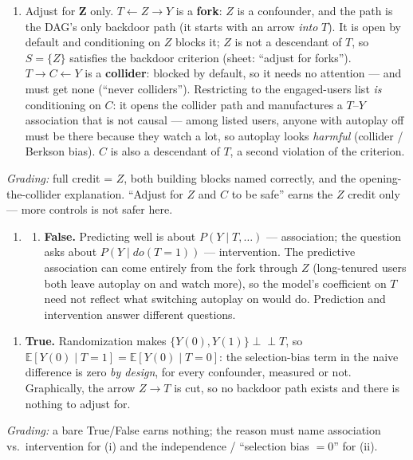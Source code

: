 \documentclass[
  11pt,
]{article}
\newcounter{none} %
\providecommand{\tightlist}{%
  \setlength{\itemsep}{0pt}\setlength{\parskip}{0pt}}
\begin{document}
\begin{solutionbox}

\begin{enumerate}
\def\labelenumi{(\alph{enumi})}
\tightlist
\item
  Adjust for \(\mathbf{Z}\) only. \(T\leftarrow Z\to Y\) is a
  \textbf{fork}: \(Z\) is a confounder, and the path is the DAG's only
  backdoor path (it starts with an arrow \emph{into} \(T\)). It is open
  by default and conditioning on \(Z\) blocks it; \(Z\) is not a
  descendant of \(T\), so \(S=\{Z\}\) satisfies the backdoor criterion
  (sheet: ``adjust for forks''). \(T\to C\leftarrow Y\) is a
  \textbf{collider}: blocked by default, so it needs no attention ---
  and must get none (``never colliders''). Restricting to the
  engaged-users list \emph{is} conditioning on \(C\): it opens the
  collider path and manufactures a \(T\)--\(Y\) association that is not
  causal --- among listed users, anyone with autoplay off must be there
  because they watch a lot, so autoplay looks \emph{harmful} (collider /
  Berkson bias). \(C\) is also a descendant of \(T\), a second violation
  of the criterion.
\end{enumerate}

\emph{Grading:} full credit = \(Z\), both building blocks named
correctly, and the opening-the-collider explanation. ``Adjust for \(Z\)
and \(C\) to be safe'' earns the \(Z\) credit only --- more controls is
not safer here.

\begin{enumerate}
\def\labelenumi{(\alph{enumi})}
\setcounter{enumi}{1}
\tightlist
\item
  \begin{enumerate}
  \def\labelenumii{(\roman{enumii})}
  \tightlist
  \item
    \textbf{False.} Predicting well is about \(P(Y\mid T, \dots)\) ---
    association; the question asks about \(P(Y\mid do(T{=}1))\) ---
    intervention. The predictive association can come entirely from the
    fork through \(Z\) (long-tenured users both leave autoplay on and
    watch more), so the model's coefficient on \(T\) need not reflect
    what switching autoplay on would do. Prediction and intervention
    answer different questions.
  \end{enumerate}
\end{enumerate}

\begin{enumerate}
\def\labelenumi{(\roman{enumi})}
\setcounter{enumi}{1}
\tightlist
\item
  \textbf{True.} Randomization makes
  \(\{Y(0),Y(1)\}\perp\!\!\!\perp T\), so
  \(\mathbb E[Y(0)\mid T{=}1] = \mathbb E[Y(0)\mid T{=}0]\): the
  selection-bias term in the naive difference is zero \emph{by design},
  for every confounder, measured or not. Graphically, the arrow
  \(Z\to T\) is cut, so no backdoor path exists and there is nothing to
  adjust for.
\end{enumerate}

\emph{Grading:} a bare True/False earns nothing; the reason must name
association vs.~intervention for (i) and the independence / ``selection
bias \(=0\)'' for (ii).

\end{solutionbox}
\end{document}
